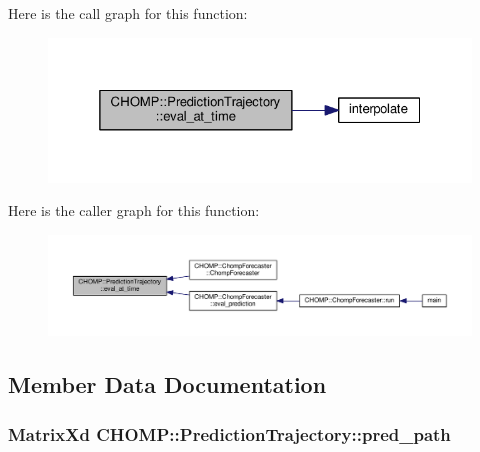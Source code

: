 Here is the call graph for this function\+:
\nopagebreak
\begin{figure}[H]
\begin{center}
\leavevmode
\includegraphics[width=325pt]{struct_c_h_o_m_p_1_1_prediction_trajectory_a3074031665bc857a9482849679fed32f_cgraph}
\end{center}
\end{figure}




Here is the caller graph for this function\+:
\nopagebreak
\begin{figure}[H]
\begin{center}
\leavevmode
\includegraphics[width=350pt]{struct_c_h_o_m_p_1_1_prediction_trajectory_a3074031665bc857a9482849679fed32f_icgraph}
\end{center}
\end{figure}




\subsection{Member Data Documentation}
\subsubsection[{\texorpdfstring{pred\+\_\+path}{pred_path}}]{\setlength{\rightskip}{0pt plus 5cm}Matrix\+Xd C\+H\+O\+M\+P\+::\+Prediction\+Trajectory\+::pred\+\_\+path}\hypertarget{struct_c_h_o_m_p_1_1_prediction_trajectory_af07e1c23267f79f9e7ec029bcbb246b8}{}\label{struct_c_h_o_m_p_1_1_prediction_trajectory_af07e1c23267f79f9e7ec029bcbb246b8}


